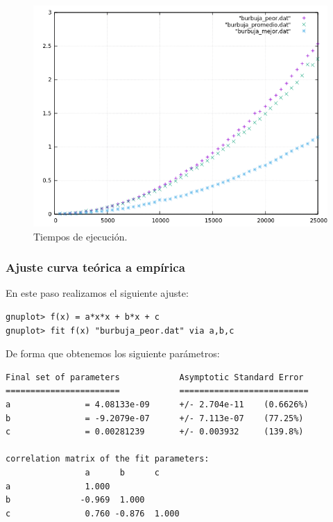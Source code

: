\begin{figure}[H]
    \begin{center}
        \includegraphics[scale=0.7]{imagenes/g_b.png}
        \caption{Tiempos de ejecución.}
        \label{fig2}
    \end{center}
\end{figure}

\subsubsection{Ajuste curva teórica a empírica}

En este paso realizamos el siguiente ajuste:
\begin{shaded*}
\begin{verbatim}
gnuplot> f(x) = a*x*x + b*x + c
gnuplot> fit f(x) "burbuja_peor.dat" via a,b,c
\end{verbatim}
\end{shaded*}

De forma que obtenemos los siguiente parámetros:

\begin{shaded*}
\begin{verbatim}
Final set of parameters            Asymptotic Standard Error
=======================            ==========================
a               = 4.08133e-09      +/- 2.704e-11    (0.6626%)
b               = -9.2079e-07      +/- 7.113e-07    (77.25%)
c               = 0.00281239       +/- 0.003932     (139.8%)

correlation matrix of the fit parameters:
                a      b      c      
a               1.000 
b              -0.969  1.000 
c               0.760 -0.876  1.000 

\end{verbatim}
\end{shaded*}


